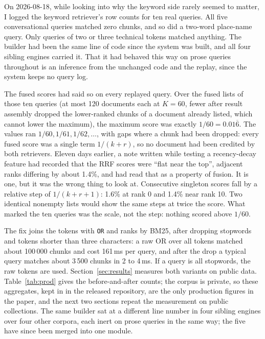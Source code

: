 \documentclass[11pt]{article}
\begin{document}
On 2026-08-18, while looking into why the keyword side rarely seemed to matter, I logged the keyword retriever's row counts for ten real queries. All five conversational queries matched zero chunks, and so did a two-word place-name query. Only queries of two or three technical tokens matched anything. The builder had been the same line of code since the system was built, and all four sibling engines carried it. That it had behaved this way on prose queries throughout is an inference from the unchanged code and the replay, since the system keeps no query log.

The fused scores had said so on every replayed query. Over the fused lists of those ten queries (at most 120 documents each at $K = 60$, fewer after result assembly dropped the lower-ranked chunks of a document already listed, which cannot lower the maximum), the maximum score was exactly $1/60 = 0.01\overline{6}$. The values ran $1/60, 1/61, 1/62, \ldots$, with gaps where a chunk had been dropped: every fused score was a single term $1/(k+r)$, so no document had been credited by both retrievers. Eleven days earlier, a note written while testing a recency-decay feature had recorded that the RRF scores were ``flat near the top'', adjacent ranks differing by about 1.4\%, and had read that as a property of fusion. It is one, but it was the wrong thing to look at. Consecutive singleton scores fall by a relative step of $1/(k+r+1)$: 1.6\% at rank 0 and 1.4\% near rank 10. Two identical nonempty lists would show the same steps at twice the score. What marked the ten queries was the scale, not the step: nothing scored above $1/60$.

The fix joins the tokens with \verb|OR| and ranks by BM25, after dropping stopwords and tokens shorter than three characters: a raw OR over all tokens matched about 100\,000 chunks and cost 161\,ms per query, and after the drop a typical query matches about 3\,500 chunks in 2 to 4\,ms. If a query is all stopwords, the raw tokens are used. Section~\ref{sec:results} measures both variants on public data. Table~\ref{tab:prod} gives the before-and-after counts; the corpus is private, so these aggregates, kept in  in the released repository, are the only production figures in the paper, and the next two sections repeat the measurement on public collections. The same builder sat at a different line number in four sibling engines over four other corpora, each inert on prose queries in the same way; the five have since been merged into one module.
\end{document}

